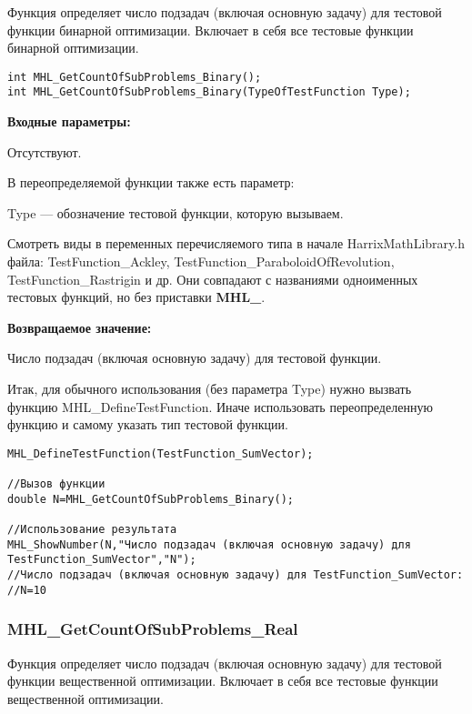 \documentclass[a4paper,12pt]{article}
\begin{document}
Функция определяет число подзадач (включая основную задачу) для тестовой функции бинарной оптимизации. Включает в себя все тестовые функции бинарной оптимизации.


\begin{lstlisting}[label=code_syntax_MHL_GetCountOfSubProblems_Binary,caption=Синтаксис]
int MHL_GetCountOfSubProblems_Binary();
int MHL_GetCountOfSubProblems_Binary(TypeOfTestFunction Type);
\end{lstlisting}

\textbf{Входные параметры:}

Отсутствуют.

В переопределяемой функции также есть параметр:
  
Type --- обозначение тестовой функции, которую вызываем.

Смотреть виды в переменных перечисляемого типа в начале HarrixMathLibrary.h файла: TestFunction\_Ackley, TestFunction\_ParaboloidOfRevolution, TestFunction\_Rastrigin и др. Они совпадают с названиями одноименных тестовых функций, но без приставки \textbf{MHL\_}.

\textbf{Возвращаемое значение:}
 
Число подзадач (включая основную задачу) для тестовой функции.

Итак, для обычного использования (без параметра Type) нужно вызвать функцию MHL\_DefineTestFunction. Иначе использовать переопределенную функцию и самому указать тип тестовой функции.


\begin{lstlisting}[label=code_use_MHL_GetCountOfSubProblems_Binary,caption=Пример использования]
MHL_DefineTestFunction(TestFunction_SumVector);

//Вызов функции
double N=MHL_GetCountOfSubProblems_Binary();

//Использование результата
MHL_ShowNumber(N,"Число подзадач (включая основную задачу) для TestFunction_SumVector","N");
//Число подзадач (включая основную задачу) для TestFunction_SumVector:
//N=10
\end{lstlisting}

\subsubsection{MHL\_GetCountOfSubProblems\_Real}\label{MHL_GetCountOfSubProblems_Real}

Функция определяет число подзадач (включая основную задачу) для тестовой функции вещественной оптимизации. Включает в себя все тестовые функции вещественной оптимизации.
\end{document}
